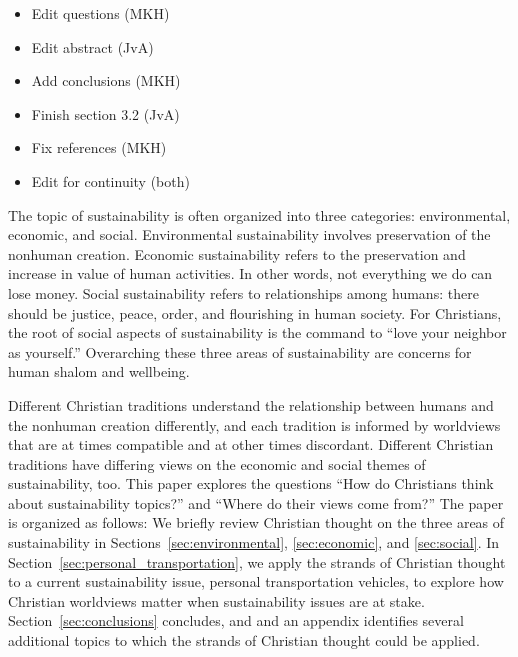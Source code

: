 \documentclass[12pt]{article}
\begin{document}
%
\begin{itemize}

  \item Edit questions (MKH)

  \item Edit abstract (JvA)
  
  \item Add conclusions (MKH)
  
  \item Finish section 3.2 (JvA)
  
  
  \item Fix references (MKH)
  
  \item Edit for continuity (both)

\end{itemize}
%

The topic of sustainability is often organized into three categories: 
environmental, economic, and social. 
Environmental sustainability involves preservation of the nonhuman creation.
Economic sustainability refers to
the preservation and increase in value of human activities. 
In other words, not everything we do can lose money. 
Social sustainability refers to relationships among humans: 
there should be justice, peace, order, and flourishing in human society. 
For Christians, the root of social aspects of sustainability
is the command to ``love your neighbor as yourself.'' 
Overarching these three areas of sustainability are 
concerns for human shalom and wellbeing.

Different Christian traditions understand the relationship 
between humans and the nonhuman creation differently, and
each tradition is informed by worldviews 
that are at times compatible and at other times discordant. 
Different Christian traditions have differing views 
on the economic and social themes of sustainability, too.
This paper explores the questions 
``How do Christians think about sustainability topics?'' 
and 
``Where do their views come from?'' 
The paper is organized as follows:
We briefly review Christian thought on the three areas of sustainability
in Sections~\ref{sec:environmental}, \ref{sec:economic}, and \ref{sec:social}.
In Section~\ref{sec:personal_transportation}, 
we apply the strands of Christian thought
to a current sustainability issue,
personal transportation vehicles,
to explore how Christian worldviews matter 
when sustainability issues are at stake.
Section~\ref{sec:conclusions} concludes, and
and an appendix identifies several additional topics to which 
the strands of Christian thought could be applied.
\end{document}
